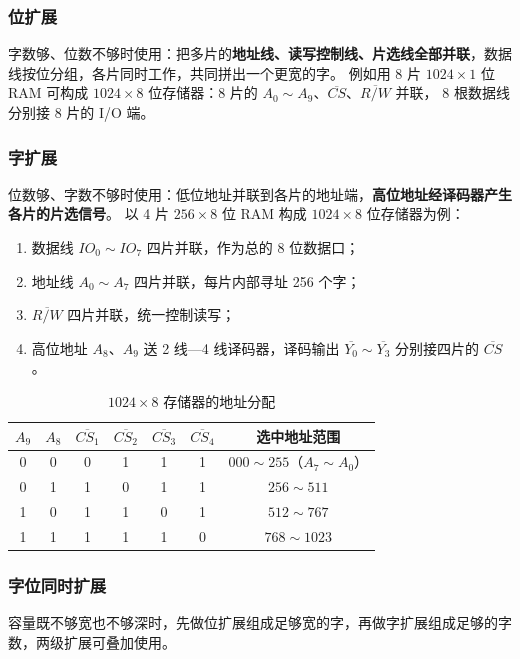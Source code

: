 \subsubsection{位扩展}
字数够、位数不够时使用：把多片的\textbf{地址线、读写控制线、片选线全部并联}，数据线按位分组，各片同时工作，共同拼出一个更宽的字。
例如用 8 片 $1024\times 1$ 位 RAM 可构成 $1024\times 8$ 位存储器：8 片的 $A_0\sim A_9$、$\overline{CS}$、$\overline{R/W}$ 并联，
8 根数据线分别接 8 片的 I/O 端。

\subsubsection{字扩展}
位数够、字数不够时使用：低位地址并联到各片的地址端，\textbf{高位地址经译码器产生各片的片选信号}。
以 4 片 $256\times 8$ 位 RAM 构成 $1024\times 8$ 位存储器为例：

\begin{enumerate}
    \item 数据线 $IO_0\sim IO_7$ 四片并联，作为总的 8 位数据口；
    \item 地址线 $A_0\sim A_7$ 四片并联，每片内部寻址 256 个字；
    \item $\overline{R/W}$ 四片并联，统一控制读写；
    \item 高位地址 $A_8$、$A_9$ 送 2 线—4 线译码器，译码输出 $\overline{Y_0}\sim\overline{Y_3}$ 分别接四片的 $\overline{CS}$。
\end{enumerate}

\begin{table}[!htbp]
\centering
\caption{$1024\times 8$ 存储器的地址分配}
\begin{tabular}{cc|cccc|c}
\toprule
$A_9$ & $A_8$ & $\overline{CS_1}$ & $\overline{CS_2}$ & $\overline{CS_3}$ & $\overline{CS_4}$ & 选中地址范围 \\
\midrule
0 & 0 & 0 & 1 & 1 & 1 & $000\sim255$（$A_7\sim A_0$） \\
0 & 1 & 1 & 0 & 1 & 1 & $256\sim511$ \\
1 & 0 & 1 & 1 & 0 & 1 & $512\sim767$ \\
1 & 1 & 1 & 1 & 1 & 0 & $768\sim1023$ \\
\bottomrule
\end{tabular}
\end{table}

\subsubsection{字位同时扩展}
容量既不够宽也不够深时，先做位扩展组成足够宽的字，再做字扩展组成足够的字数，两级扩展可叠加使用。

